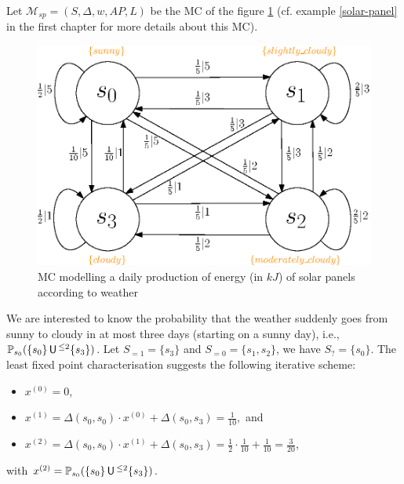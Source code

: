 \begin{example}
Let $\mathcal{M}_{sp} = (S, \Delta, w, AP, L)$ be the MC of the figure \ref{solarpanel} (cf. example \ref{solar-panel} in the first chapter for more details about this MC).
  \begin{figure}[h!]
    \centering
    \includegraphics[width=0.5\linewidth]{resources/weather-solar-pannel}
    \captionsetup{justification=centering}
    \caption{MC modelling a daily production of energy (in $kJ$) of solar panels according to weather}
    \label{solarpanel}
  \end{figure}
  We are interested to know the probability that the weather suddenly goes from sunny to cloudy in at most three days
  (starting on a sunny day), i.e., $\mathbb{P}_{s_0}(\{s_0\} \,\text{\sffamily U}\,^{\leq 2} \{s_3\})$.
  Let $S_{=1} = \{s_3\}$ and $S_{=0} = \{ s_1, s_2 \}$, we have $S_? = \{s_0\}$. The least fixed point characterisation suggests the following iterative scheme:
  \begin{itemize}
    \item $x^{(0)} = 0$,
    \item $x^{(1)} = \Delta(s_0, s_0) \cdot x^{(0)} + \Delta(s_0, s_3) = \frac{1}{10},$ and
    \item $x^{(2)} = \Delta(s_0, s_0) \cdot x^{(1)} + \Delta(s_0, s_3) = \frac{1}{2} \cdot \frac{1}{10} + \frac{1}{10} = \frac{3}{20}$,
  \end{itemize}
  with $x^{(2)} = \mathbb{P}_{s_0}(\{s_0\} \,\text{\sffamily U}\,^{\leq 2} \{s_3\})$.
\end{example}
